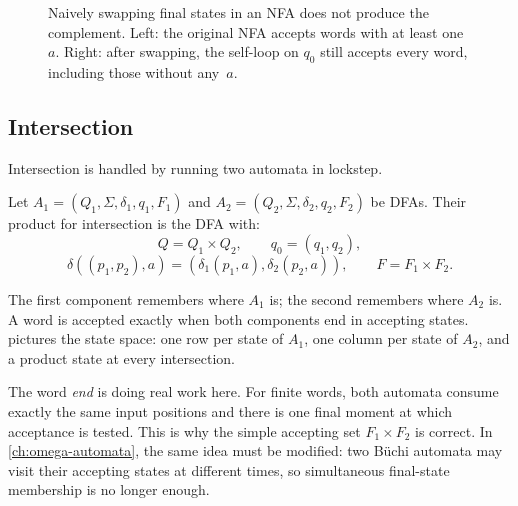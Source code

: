 \begin{figure}[ht]
\centering
{}
\caption{Naively swapping final states in an NFA does not produce the
complement.  Left: the original NFA accepts words with at least one~$a$.
Right: after swapping, the self-loop on $q_0$ still accepts every word,
including those without any~$a$.}
\label{fig:complement-nfa-failure}
\end{figure}

\subsection{Intersection}
\label{subsec:finite-intersection}

Intersection is handled by running two automata in lockstep.

\begin{definition}
\label{def:product-automaton}
Let
$A_1=(Q_1,\Sigma,\delta_1,q_1,F_1)$ and
$A_2=(Q_2,\Sigma,\delta_2,q_2,F_2)$ be DFAs.  Their product for
intersection is the DFA with:
\[
  Q=Q_1\times Q_2,\qquad
  q_0=(q_1,q_2),
\]
\[
  \delta((p_1,p_2),a)=(\delta_1(p_1,a),\delta_2(p_2,a)),
  \qquad
  F=F_1\times F_2.
\]
\end{definition}

The first component remembers where $A_1$ is; the second remembers where
$A_2$ is.  A word is accepted exactly when both components end in
accepting states.   pictures the state space:
one row per state of $A_1$, one column per state of $A_2$, and a
product state at every intersection.

The word \emph{end} is doing real work here.  For finite words, both
automata consume exactly the same input positions and there is one final
moment at which acceptance is tested.  This is why the simple accepting
set $F_1\times F_2$ is correct.  In \cref{ch:omega-automata}, the same
idea must be modified: two B\"uchi automata may visit their accepting
states at different times, so simultaneous final-state membership is no
longer enough.

